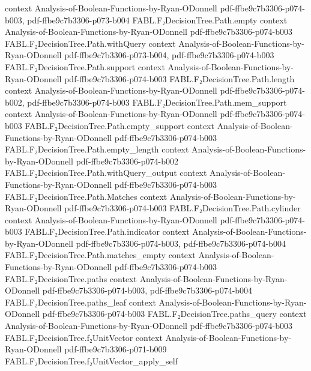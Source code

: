 \begin{theorem}
  {context}
  {Analysis-of-Boolean-Functions-by-Ryan-ODonnell}
  {pdf-ffbe9c7b3306-p074-b003,
    pdf-ffbe9c7b3306-p073-b004}
\proofstep
  {FABL.F₂DecisionTree.Path.empty}
  {context}
  {Analysis-of-Boolean-Functions-by-Ryan-ODonnell}
  {pdf-ffbe9c7b3306-p074-b003}
\proofstep
  {FABL.F₂DecisionTree.Path.withQuery}
  {context}
  {Analysis-of-Boolean-Functions-by-Ryan-ODonnell}
  {pdf-ffbe9c7b3306-p073-b004,
    pdf-ffbe9c7b3306-p074-b003}
\proofstep
  {FABL.F₂DecisionTree.Path.support}
  {context}
  {Analysis-of-Boolean-Functions-by-Ryan-ODonnell}
  {pdf-ffbe9c7b3306-p074-b003}
\proofstep
  {FABL.F₂DecisionTree.Path.length}
  {context}
  {Analysis-of-Boolean-Functions-by-Ryan-ODonnell}
  {pdf-ffbe9c7b3306-p074-b002,
    pdf-ffbe9c7b3306-p074-b003}
\proofstep
  {FABL.F₂DecisionTree.Path.mem_support}
  {context}
  {Analysis-of-Boolean-Functions-by-Ryan-ODonnell}
  {pdf-ffbe9c7b3306-p074-b003}
\proofstep
  {FABL.F₂DecisionTree.Path.empty_support}
  {context}
  {Analysis-of-Boolean-Functions-by-Ryan-ODonnell}
  {pdf-ffbe9c7b3306-p074-b003}
\proofstep
  {FABL.F₂DecisionTree.Path.empty_length}
  {context}
  {Analysis-of-Boolean-Functions-by-Ryan-ODonnell}
  {pdf-ffbe9c7b3306-p074-b002}
\proofstep
  {FABL.F₂DecisionTree.Path.withQuery_output}
  {context}
  {Analysis-of-Boolean-Functions-by-Ryan-ODonnell}
  {pdf-ffbe9c7b3306-p074-b003}
\proofstep
  {FABL.F₂DecisionTree.Path.Matches}
  {context}
  {Analysis-of-Boolean-Functions-by-Ryan-ODonnell}
  {pdf-ffbe9c7b3306-p074-b003}
\proofstep
  {FABL.F₂DecisionTree.Path.cylinder}
  {context}
  {Analysis-of-Boolean-Functions-by-Ryan-ODonnell}
  {pdf-ffbe9c7b3306-p074-b003}
\proofstep
  {FABL.F₂DecisionTree.Path.indicator}
  {context}
  {Analysis-of-Boolean-Functions-by-Ryan-ODonnell}
  {pdf-ffbe9c7b3306-p074-b003,
    pdf-ffbe9c7b3306-p074-b004}
\proofstep
  {FABL.F₂DecisionTree.Path.matches_empty}
  {context}
  {Analysis-of-Boolean-Functions-by-Ryan-ODonnell}
  {pdf-ffbe9c7b3306-p074-b003}
\proofstep
  {FABL.F₂DecisionTree.paths}
  {context}
  {Analysis-of-Boolean-Functions-by-Ryan-ODonnell}
  {pdf-ffbe9c7b3306-p074-b003,
    pdf-ffbe9c7b3306-p074-b004}
\proofstep
  {FABL.F₂DecisionTree.paths_leaf}
  {context}
  {Analysis-of-Boolean-Functions-by-Ryan-ODonnell}
  {pdf-ffbe9c7b3306-p074-b003}
\proofstep
  {FABL.F₂DecisionTree.paths_query}
  {context}
  {Analysis-of-Boolean-Functions-by-Ryan-ODonnell}
  {pdf-ffbe9c7b3306-p074-b003}
\proofstep
  {FABL.F₂DecisionTree.f₂UnitVector}
  {context}
  {Analysis-of-Boolean-Functions-by-Ryan-ODonnell}
  {pdf-ffbe9c7b3306-p071-b009}
\proofstep
  {FABL.F₂DecisionTree.f₂UnitVector_apply_self}

\end{theorem}
